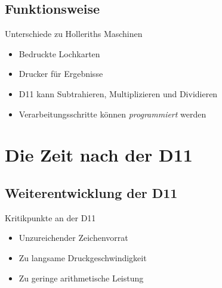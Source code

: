 \documentclass[EU2]{beamer}
\begin{document}
\subsection{Funktionsweise}

\begin{frame}{Unterschiede zu Holleriths Maschinen}
  \begin{itemize}
    \item Bedruckte Lochkarten
    \item Drucker für Ergebnisse
    \item D11 kann Subtrahieren, Multiplizieren und Dividieren
    \item Verarbeitungsschritte können \emph{programmiert} werden
  \end{itemize}
\end{frame}

\section{Die Zeit nach der D11}

\subsection{Weiterentwicklung der D11}

\begin{frame}{Kritikpunkte an der D11}
    \begin{itemize}
      \item Unzureichender Zeichenvorrat
      \item Zu langsame Druckgeschwindigkeit
      \item Zu geringe arithmetische Leistung
    \end{itemize}
\end{frame}
\end{document}
